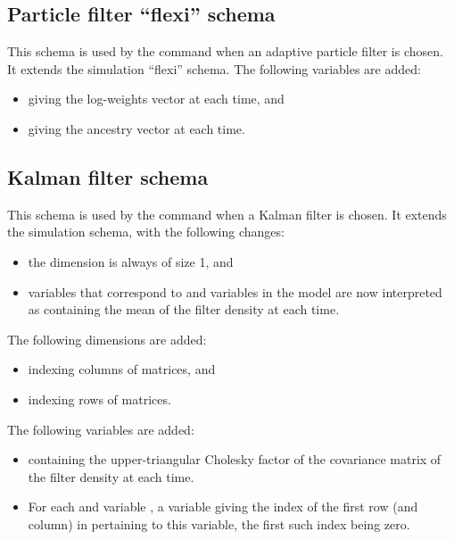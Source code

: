 \subsection{Particle filter ``flexi'' schema}

This schema is used by the  command when an adaptive
particle filter is chosen. It extends the simulation ``flexi'' schema. The
following variables are added:
\begin{itemize}
\item {} giving the log-weights vector at each time, and
\item {} giving the ancestry vector at each time.
\end{itemize}

\subsection{Kalman filter schema}

This schema is used by the  command when a Kalman filter is
chosen. It extends the simulation schema, with the following changes:
\begin{itemize}
\item the  dimension is always of size 1, and
\item variables that correspond to  and  variables
  in the model are now interpreted as containing the mean of the filter
  density at each time.
\end{itemize}

The following dimensions are added:
\begin{itemize}
\item {} indexing columns of matrices, and
\item {} indexing rows of matrices.
\end{itemize}

The following variables are added:
\begin{itemize}
\item {} containing the upper-triangular Cholesky
  factor of the covariance matrix of the filter density at each time.
\item For each  and  variable , a
  variable  giving the index of the first row (and
  column) in  pertaining to this variable, the first such index being
  zero.
\end{itemize}

